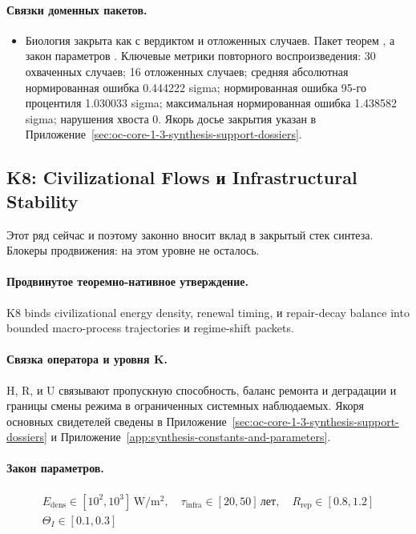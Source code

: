 \paragraph{Связки доменных пакетов.}
\begin{itemize}[leftmargin=1.6em,nosep]
\item Биология закрыта как  с вердиктом  и  отложенных случаев. Пакет теорем , а закон параметров . Ключевые метрики повторного воспроизведения: 30 охваченных случаев; 16 отложенных случаев; средняя абсолютная нормированная ошибка 0.444222 sigma; нормированная ошибка 95-го процентиля 1.030033 sigma; максимальная нормированная ошибка 1.438582 sigma; нарушения хвоста 0. Якорь досье закрытия указан в Приложение~\ref{sec:oc-core-1-3-synthesis-support-dossiers}.
\end{itemize}

\subsection{K8: Civilizational Flows и Infrastructural Stability}
\label{sec:oc-core-1-3-synthesis-k8}
Этот ряд сейчас  и поэтому законно вносит вклад в закрытый стек синтеза.
Блокеры продвижения: на этом уровне не осталось.

\paragraph{Продвинутое теоремно-нативное утверждение.}
K8 binds civilizational energy density, renewal timing, и repair-decay balance into bounded macro-process trajectories и regime-shift packets.

\paragraph{Связка оператора и уровня K.}
H, R, и U связывают пропускную способность, баланс ремонта и деградации и границы смены режима в ограниченных системных наблюдаемых.
Якоря основных свидетелей сведены в Приложение~\ref{sec:oc-core-1-3-synthesis-support-dossiers} и Приложение~\ref{app:synthesis-constants-and-parameters}.

\paragraph{Закон параметров.}
\[
\begin{gathered} E_{\mathrm{dens}} \in [10^2,10^3]\,\mathrm{W/m^2},\quad \tau_{\mathrm{infra}} \in [20,50]\,\mathrm{лет},\quad R_{\mathrm{rep}} \in [0.8,1.2] \\ \Theta_I \in [0.1,0.3] \end{gathered}
\]

